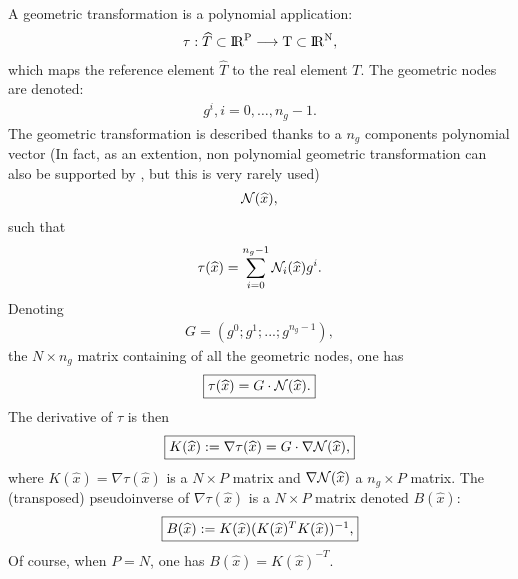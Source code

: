\documentclass[a4paper,11pt,english]{sphinxmanual}
\begin{document}
A geometric transformation is a polynomial application:
\begin{equation*}
\begin{split}\tau : \widehat{T} \subset \rm I\hspace{-0.15em}R^P \longrightarrow T \subset \rm I\hspace{-0.15em}R^N,\end{split}
\end{equation*}
which maps the reference element \(\widehat{T}\) to the real element \(T\). The
geometric nodes are denoted:
\begin{equation*}
\begin{split}g^i, i = 0, \ldots, n_g - 1.\end{split}
\end{equation*}
The geometric transformation is described thanks to a \(n_g\) components
polynomial vector (In fact, as an extention, non polynomial geometric
transformation can also be supported by , but this is very rarely used)
\begin{equation*}
\begin{split}{\cal N}(\widehat{x}),\end{split}
\end{equation*}
such that
\begin{equation*}
\begin{split}\tau(\widehat{x}) = \sum_{i = 0}^{n_g - 1}{\cal N}_i(\widehat{x}) g^i.\end{split}
\end{equation*}
Denoting
\begin{equation*}
\begin{split}G = (g^0; g^1; ...; g^{n_g - 1}),\end{split}
\end{equation*}
the \(N\times n_g\) matrix containing of all the geometric nodes, one has
\begin{equation*}
\begin{split}\fbox{$\tau(\widehat{x}) = G\cdot{\cal N}(\widehat{x})$.}\end{split}
\end{equation*}
The derivative of \(\tau\) is then
\begin{equation*}
\begin{split}\fbox{$K(\widehat{x}) := \nabla\tau(\widehat{x}) = G\cdot\nabla {\cal N}(\widehat{x})$,}\end{split}
\end{equation*}
where \(K(\widehat{x}) = \nabla\tau(\widehat{x})\) is a \(N\times P\) matrix and
\(\nabla {\cal N}(\widehat{x})\) a \(n_g\times P\) matrix. The (transposed)
pseudo\sphinxhyphen{}inverse of \(\nabla\tau(\widehat{x})\) is a \(N\times P\) matrix denoted
\(B(\widehat{x})\):
\begin{equation*}
\begin{split}\fbox{$B(\widehat{x}) := K(\widehat{x})(K(\widehat{x})^T K(\widehat{x}))^{-1}$,}\end{split}
\end{equation*}
Of course, when \(P=N\), one has \(B(\widehat{x})=K(\widehat{x})^{-T}\).
\end{document}
